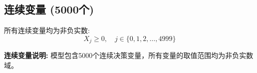 \documentclass[a4paper,10pt]{article}
\begin{document}
\subsection{连续变量 (5000个)}

所有连续变量均为非负实数:
\begin{equation}
X_j \geq 0, \quad j \in \{0, 1, 2, \ldots, 4999\}
\end{equation}

\textbf{连续变量说明:} 模型包含5000个连续决策变量，所有变量的取值范围均为非负实数域。
\end{document}
